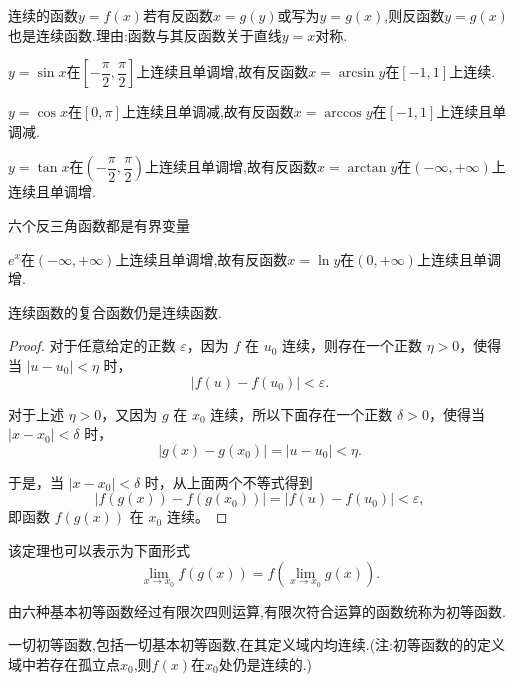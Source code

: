 \begin{theorem}
    连续的函数$y=f(x)$若有反函数$x = g(y)$或写为$y=g(x)$,则反函数$y=g(x)$也是连续函数.理由:函数与其反函数关于直线$y=x$对称.

\end{theorem}

\begin{example}
    $y=\sin x$在$[-\dfrac{\pi}{2},\dfrac{\pi}{2}]$上连续且单调增,故有反函数$x=\arcsin y$在$[-1,1]$上连续.

    $y=\cos x$在$[0,\pi]$上连续且单调减,故有反函数$x=\arccos y$在$[-1,1]$上连续且单调减.

    $y=\tan x$在$(-\dfrac{\pi}{2},\dfrac{\pi}{2})$上连续且单调增,故有反函数$x=\arctan y$在$(-\infty,+\infty)$上连续且单调增.

    \begin{remark}
        六个反三角函数都是有界变量
    \end{remark}
\end{example}

\begin{example}
    $e^x$在$(-\infty,+\infty)$上连续且单调增,故有反函数$x=\ln y$在$(0,+\infty)$上连续且单调增.
\end{example}

\begin{theorem}
    连续函数的复合函数仍是连续函数.
\end{theorem}

\begin{proof}
    对于任意给定的正数 $\varepsilon$，因为 $f$ 在 $u_0$ 连续，则存在一个正数 $\eta > 0$，使得当 $|u - u_0| < \eta$ 时，
    $$
        |f(u) - f(u_0)| < \varepsilon.
    $$

    对于上述 $\eta > 0$，又因为 $g$ 在 $x_0$ 连续，所以下面存在一个正数 $\delta > 0$，使得当 $|x - x_0| < \delta$ 时，
    $$
        |g(x) - g(x_0)| = |u - u_0| < \eta.
    $$

    于是，当 $|x - x_0| < \delta$ 时，从上面两个不等式得到
    $$
        |f(g(x)) - f(g(x_0))| = |f(u) - f(u_0)| < \varepsilon,
    $$
    即函数 $f(g(x))$ 在 $x_0$ 连续。
\end{proof}

该定理也可以表示为下面形式
$$
    \lim_{x \to x_0} f(g(x)) = f \left( \lim_{x \to x_0} g(x) \right).
$$

由六种基本初等函数经过有限次四则运算,有限次符合运算的函数统称为初等函数.

\begin{theorem}
    一切初等函数,包括一切基本初等函数,在其定义域内均连续.(注:初等函数的的定义域中若存在孤立点$x_0$,则$f(x)$在$x_0$处仍是连续的.)
\end{theorem}